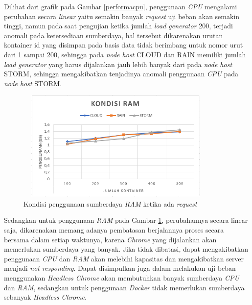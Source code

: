 				Dilihat dari grafik pada Gambar \ref{performacpu}, penggunaan \textit{CPU} mengalami perubahan secara \textit{linear} yaitu semakin banyak \textit{request} uji beban akan semakin tinggi, namun pada saat pengujian ketika jumlah \textit{load generator} 200, terjadi anomali pada ketersediaan sumberdaya, hal tersebut dikarenakan urutan kontainer id yang disimpan pada basis data tidak berimbang untuk nomor urut dari 1 sampai 200, sehingga pada \textit{node host} CLOUD dan RAIN memiliki jumlah \textit{load generator} yang harus dijalankan jauh lebih banyak dari pada \textit{node host} STORM, sehingga mengakibatkan tenjadinya anomali penggunaan \textit{CPU} pada \textit{node host} STORM.
				
				\begin{figure}[H]
					\centering
					\includegraphics[width=10cm,height=5.5cm]{Images/C-5/performaram.PNG}
					\caption{Kondisi penggunaan sumberdaya \textit{RAM} ketika ada \textit{request}}
					\label{performaram}
				\end{figure}
				
				Sedangkan untuk penggunaan \textit{RAM} pada Gambar \ref{performaram}, perubahannya secara linear saja, dikarenakan memang adanya pembatasan berjalannya proses secara bersama dalam setiap waktunya, karena \textit{Chrome} yang dijalankan akan memerlukan sumberdaya yang banyak. Jika tidak dibatasi, dapat mengakibatkan penggunaan \textit{CPU} dan \textit{RAM} akan melebihi kapasitas dan mengakibatkan server menjadi \textit{not responding}. Dapat disimpulkan juga dalam melakukan uji beban menggunakan \textit{Headless Chrome} akan membutuhkan banyak sumberdaya \textit{CPU} dan \textit{RAM}, sedangkan untuk penggunaan \textit{Docker} tidak memerlukan sumberdaya sebanyak \textit{Headless Chrome}.
				